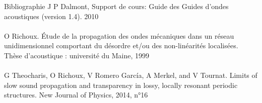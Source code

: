 \documentclass[12pt,xcolor=x11names,compress, notes=show]{beamer}%
\begin{document}
\begin{frame}{Bibliographie}
\indent J P Dalmont, Support de cours: Guide des Guides d'ondes acoustiques (version 1.4). 2010 \\ ~\\
\indent O Richoux. Étude de la propagation des ondes mécaniques dans un réseau unidimensionnel comportant du désordre et/ou des non-linéarités localisées. Thèse d'acoustique : université du Maine, 1999 \\~\\
\indent G Theocharis, O Richoux, V Romero García, A Merkel, and V Tournat. Limits of slow sound propagation and transparency in lossy, locally resonant periodic structures. New Journal of Physics, 2014, n°16


\end{frame}
\end{document}
